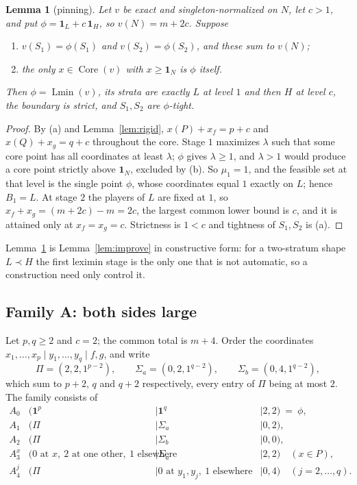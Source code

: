 \documentclass[11pt]{article}
\newtheorem{lemma}[theorem]{Lemma}
\newcommand{\core}{\operatorname{Core}}
\newcommand{\Lmin}{\operatorname{Lmin}}
\newcommand{\one}{\mathbf 1}
\begin{document}
\begin{lemma}[pinning]\label{lem:pin}
Let $v$ be exact and singleton-normalized on $N$, let $c>1$, and put
$\phi=\one_L+c\,\one_H$, so $v(N)=m+2c$.  Suppose
\begin{enumerate}[nosep,label=(\alph*)]
\item $v(S_1)=\phi(S_1)$ and $v(S_2)=\phi(S_2)$, and these sum to $v(N)$;
\item the only $x\in\core(v)$ with $x\ge\one_N$ is $\phi$ itself.
\end{enumerate}
Then $\phi=\Lmin(v)$, its strata are exactly $L$ at level $1$ and then $H$ at
level $c$, the boundary is strict, and $S_1,S_2$ are $\phi$-tight.
\end{lemma}

\begin{proof}
By (a) and Lemma~\ref{lem:rigid}, $x(P)+x_f=p+c$ and $x(Q)+x_g=q+c$ throughout
the core.  Stage $1$ maximizes $\lambda$ such that some core point has all
coordinates at least $\lambda$; $\phi$ gives $\lambda\ge1$, and $\lambda>1$
would produce a core point strictly above $\one_N$, excluded by (b).  So
$\mu_1=1$, and the feasible set at that level is the single point $\phi$, whose
coordinates equal $1$ exactly on $L$; hence $B_1=L$.  At stage $2$ the players
of $L$ are fixed at $1$, so $x_f+x_g=(m+2c)-m=2c$, the largest common lower
bound is $c$, and it is attained only at $x_f=x_g=c$.  Strictness is $1<c$ and
tightness of $S_1,S_2$ is (a).
\end{proof}

Lemma~\ref{lem:pin} is Lemma~\ref{lem:improve} in constructive form: for a
two-stratum shape $L\prec H$ the first leximin stage is the only one that is
not automatic, so a construction need only control it.

\subsection{Family A: both sides large}

Let $p,q\ge2$ and $c=2$; the common total is $m+4$.  Order the coordinates
$x_1,\dots,x_p\mid y_1,\dots,y_q\mid f,g$, and write
\[
 \Pi=(2,2,1^{p-2}),\qquad \Sigma_a=(0,2,1^{q-2}),\qquad
 \Sigma_b=(0,4,1^{q-2}),
\]
which sum to $p+2$, $q$ and $q+2$ respectively, every entry of $\Pi$ being at
most $2$.  The family consists of
\[
\begin{array}{llll}
 A_0     &(\one^p            &\mid \one^q &\mid 2,2)\ =\ \phi,\\
 A_1     &(\Pi               &\mid \Sigma_a &\mid 0,2),\\
 A_2     &(\Pi               &\mid \Sigma_b &\mid 0,0),\\
 A_3^x   &(0\text{ at }x,\ 2\text{ at one other},\ 1\text{ elsewhere}
          &\mid \Sigma_a &\mid 2,2)\quad (x\in P),\\
 A_4^j   &(\Pi &\mid 0\text{ at }y_1,y_j,\ 1\text{ elsewhere} &\mid 0,4)
          \quad (j=2,\dots,q).
\end{array}
\]
\end{document}
